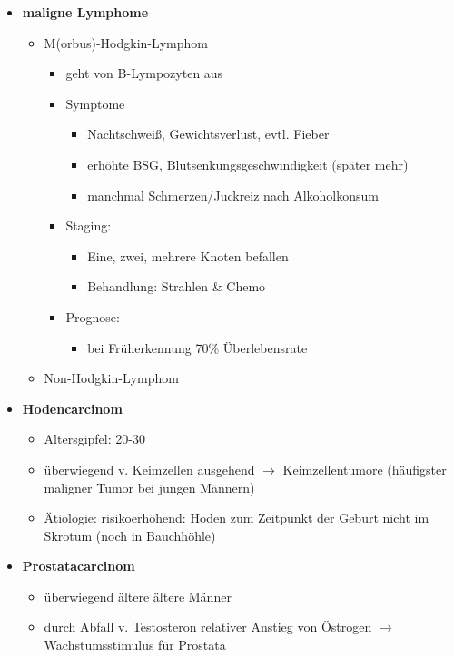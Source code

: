 \begin{itemize}
			\item \textbf{maligne Lymphome}
				\begin{itemize}
					\item M(orbus)-Hodgkin-Lymphom
						\begin{itemize}
							\item geht von B-Lympozyten aus
							\item Symptome
								\begin{itemize}
									\item Nachtschweiß, Gewichtsverlust, evtl. Fieber
									\item erhöhte BSG, Blutsenkungsgeschwindigkeit (später mehr)
									\item manchmal Schmerzen/Juckreiz nach Alkoholkonsum
								\end{itemize}
							\item Staging:
								\begin{itemize}
									\item Eine, zwei, mehrere Knoten befallen
									\item Behandlung: Strahlen \& Chemo
								\end{itemize}
							\item Prognose:
								\begin{itemize}
									\item bei Früherkennung 70\% Überlebensrate
								\end{itemize}
						\end{itemize}
					\item Non-Hodgkin-Lymphom
				\end{itemize}		
			\item \textbf{Hodencarcinom}
				\begin{itemize}
					\item Altersgipfel: 20-30
					\item überwiegend v. Keimzellen ausgehend $\rightarrow$ Keimzellentumore (häufigster maligner Tumor bei jungen Männern)
					\item Ätiologie: risikoerhöhend: Hoden zum Zeitpunkt der Geburt nicht im Skrotum (noch in Bauchhöhle)
				\end{itemize}
			\item \textbf{Prostatacarcinom}
				\begin{itemize}
					\item überwiegend ältere ältere Männer
					\item durch Abfall v. Testosteron relativer Anstieg von Östrogen $\rightarrow$ Wachstumsstimulus für Prostata

\end{itemize}
\end{itemize}
